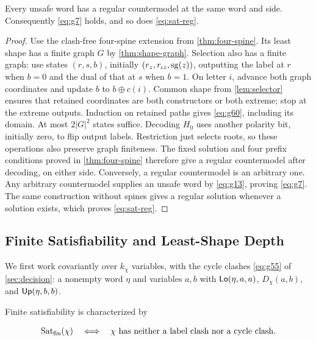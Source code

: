 \begin{theorem}\label{thm:regular-transfer}
Every unsafe word has a regular countermodel at the same word and side.
Consequently \eqref{eq:g7} holds, and so does \eqref{eq:sat-reg}.
\end{theorem}
\begin{proof}
Use the clash-free four-spine extension from \cref{thm:four-spine}.
Its least shape has a finite graph $G$ by \cref{thm:shape-graph}.
Selection also has a finite graph: use states $(r,s,b)$, initially
$(r_z,r_{\iota z},\operatorname{sg}(z))$, outputting the label at $r$
when $b=0$ and the dual of that at $s$ when $b=1$. On letter $i$, advance
both graph coordinates and update $b$ to $b\oplus c(i)$.
Common shape from \cref{lem:selector} ensures that retained coordinates
are both constructors or both extreme; stop at the extreme outputs.
Induction on retained paths gives \eqref{eq:g60}, including its
domain. At most $2|G|^2$ states suffice.
Decoding $H_0$ uses another polarity bit, initially zero, to flip output
labels. Restriction just selects roots, so these operations also preserve
graph finiteness.
The fixed solution and four prefix conditions proved in
\cref{thm:four-spine} therefore give a regular countermodel after decoding,
on either side. Conversely, a regular countermodel is an arbitrary one.
Any arbitrary countermodel supplies an unsafe word by \eqref{eq:g13},
proving \eqref{eq:g7}. The same construction without spines gives a regular
solution whenever a solution exists, which proves \eqref{eq:sat-reg}.
\end{proof}

\subsection{Finite Satisfiability and Least-Shape Depth}\label{sec:finite-sat}
We first work covariantly over $k_\chi$ variables, with the cycle clashes
\eqref{eq:g55} of \cref{sec:decision}: a nonempty word $\eta$ and variables
$a,b$ with $\mathsf{Lo}(\eta,a,a)$, $D_\chi(a,b)$, and $\mathsf{Up}(\eta,b,b)$.

\begin{theorem}\label{thm:finite-sat}
Finite satisfiability is characterized by

\begin{equation}\label{eq:g56}
\operatorname{Sat}_{\mathrm{fin}}(\chi)
 \quad\Longleftrightarrow\quad
 \chi\text{ has neither a label clash nor a cycle clash}.
\end{equation}

\end{theorem}

